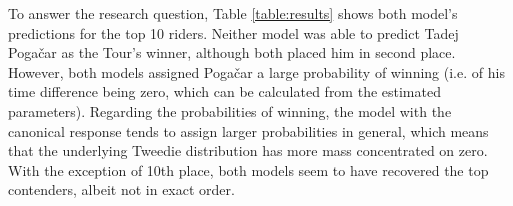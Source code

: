 \documentclass[aos,preprint]{imsart}
\begin{document}
To answer the research question, Table \ref{table:results} shows both model's predictions for the top 10 riders. Neither model was able to predict Tadej Pogačar as the Tour's winner, although both placed him in second place. However, both  models assigned Pogačar a large probability of winning (i.e. of his time difference being zero, which can be calculated from the estimated parameters). Regarding the probabilities of winning, the model with the canonical response tends to assign larger probabilities in general, which means that the underlying Tweedie distribution has more mass concentrated on zero. With the exception of 10th place, both models seem to have recovered the top contenders, albeit not in exact order.


\end{document}
